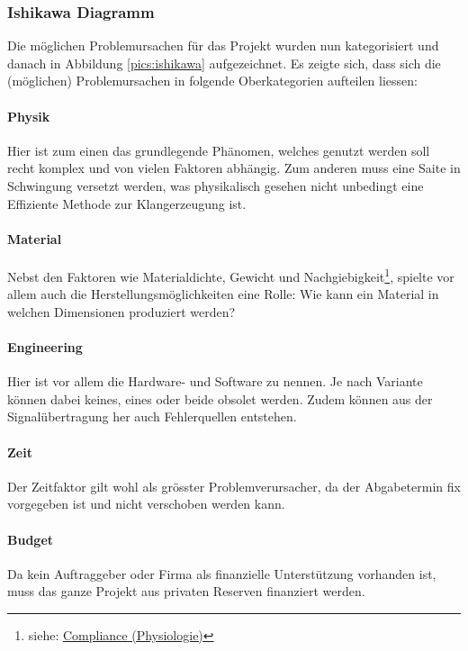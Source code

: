 \subsubsection{Ishikawa Diagramm}
Die möglichen Problemursachen für das Projekt wurden nun kategorisiert und danach in Abbildung \ref{pics:ishikawa} aufgezeichnet. Es zeigte sich, dass sich die (möglichen) Problemursachen in folgende Oberkategorien aufteilen liessen:
\paragraph{Physik} Hier ist zum einen das grundlegende Phänomen, welches genutzt werden soll recht komplex und von vielen Faktoren abhängig. Zum anderen muss eine Saite in Schwingung versetzt werden, was physikalisch gesehen nicht unbedingt eine Effiziente Methode zur Klangerzeugung ist.
\paragraph{Material} Nebst den Faktoren wie Materialdichte, Gewicht und Nachgiebigkeit\footnote{siehe: \href{https://de.wikipedia.org/wiki/Compliance_(Physiologie)}{Compliance (Physiologie)}}, spielte vor allem auch die Herstellungsmöglichkeiten eine Rolle: Wie kann ein Material in welchen Dimensionen produziert werden?
\paragraph{Engineering} Hier ist vor allem die Hardware- und Software zu nennen. Je nach Variante können dabei keines, eines oder beide obsolet werden. Zudem können aus der Signalübertragung her auch Fehlerquellen entstehen.
\paragraph{Zeit} Der Zeitfaktor gilt wohl als grösster Problemverursacher, da der Abgabetermin fix vorgegeben ist und nicht verschoben werden kann.
\paragraph{Budget} Da kein Auftraggeber oder Firma als finanzielle Unterstützung vorhanden ist, muss das ganze Projekt aus privaten Reserven finanziert werden.
